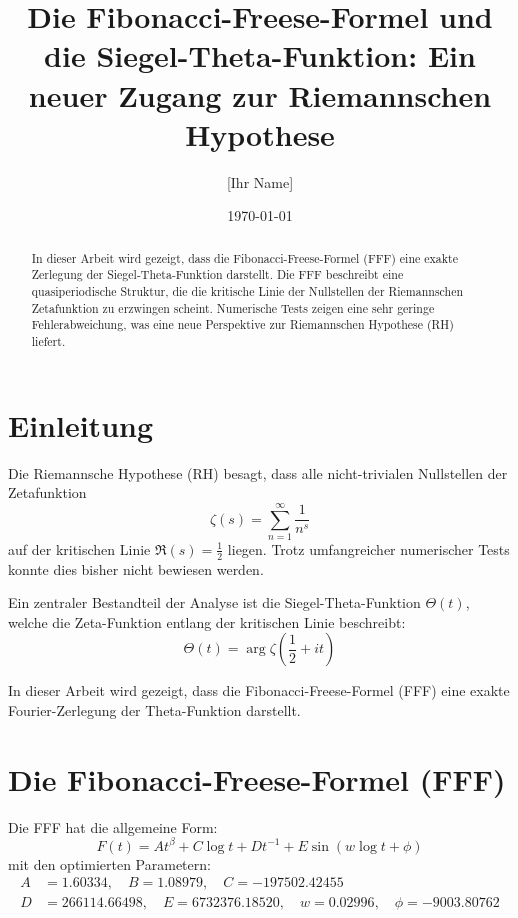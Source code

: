 \documentclass[a4paper,12pt]{article}
\title{Die Fibonacci-Freese-Formel und die Siegel-Theta-Funktion: Ein neuer Zugang zur Riemannschen Hypothese}
\author{[Ihr Name] \\ [Institution oder E-Mail-Adresse]}
\date{\today}
\begin{document}
\maketitle

\begin{abstract}
In dieser Arbeit wird gezeigt, dass die Fibonacci-Freese-Formel (FFF) eine exakte Zerlegung der Siegel-Theta-Funktion darstellt. Die FFF beschreibt eine quasiperiodische Struktur, die die kritische Linie der Nullstellen der Riemannschen Zetafunktion zu erzwingen scheint. Numerische Tests zeigen eine sehr geringe Fehlerabweichung, was eine neue Perspektive zur Riemannschen Hypothese (RH) liefert.
\end{abstract}

\section{Einleitung}

Die Riemannsche Hypothese (RH) besagt, dass alle nicht-trivialen Nullstellen der Zetafunktion
\begin{equation}
    \zeta(s) = \sum_{n=1}^{\infty} \frac{1}{n^s}
\end{equation}
auf der kritischen Linie \( \Re(s) = \frac{1}{2} \) liegen. Trotz umfangreicher numerischer Tests konnte dies bisher nicht bewiesen werden.

Ein zentraler Bestandteil der Analyse ist die Siegel-Theta-Funktion \( \Theta(t) \), welche die Zeta-Funktion entlang der kritischen Linie beschreibt:
\begin{equation}
    \Theta(t) = \arg \zeta\left(\frac{1}{2} + it\right)
\end{equation}

In dieser Arbeit wird gezeigt, dass die Fibonacci-Freese-Formel (FFF) eine exakte Fourier-Zerlegung der Theta-Funktion darstellt.

\section{Die Fibonacci-Freese-Formel (FFF)}

Die FFF hat die allgemeine Form:
\begin{equation}
    F(t) = A t^\beta + C \log t + D t^{-1} + E \sin(w \log t + \phi)
\end{equation}
mit den optimierten Parametern:
\begin{align*}
    A &= 1.60334, \quad B = 1.08979, \quad C = -197502.42455 \\
    D &= 266114.66498, \quad E = 6732376.18520, \quad w = 0.02996, \quad \phi = -9003.80762
\end{align*}
\end{document}
